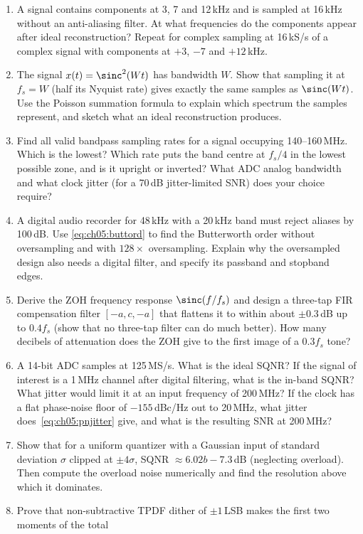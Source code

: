 \problems
\begin{enumerate}[label=\thechapter.\arabic*]
\item A signal contains components at 3, 7 and 12\,kHz and is sampled at 16\,kHz without an
anti-aliasing filter. At what frequencies do the components appear after ideal reconstruction?
Repeat for complex sampling at 16\,kS/s of a complex signal with components at $+3$, $-7$ and
$+12$\,kHz.
\item The signal $x(t)=\sinc^2(Wt)$ has bandwidth $W$. Show that sampling it at $f_s=W$ (half its
Nyquist rate) gives exactly the same samples as $\sinc(Wt)$. Use the Poisson summation formula to
explain which spectrum the samples represent, and sketch what an ideal reconstruction produces.
\item Find all valid bandpass sampling rates for a signal occupying 140--160\,MHz. Which is the
lowest? Which rate puts the band centre at $f_s/4$ in the lowest possible zone, and is it upright or
inverted? What ADC analog bandwidth and what clock jitter (for a 70\,dB jitter-limited SNR) does
your choice require?
\item A digital audio recorder for 48\,kHz with a 20\,kHz band must reject aliases by 100\,dB. Use
\eqref{eq:ch05:buttord} to find the Butterworth order without oversampling and with $128\times$
oversampling. Explain why the oversampled design also needs a digital filter, and specify its
passband and stopband edges.
\item Derive the ZOH frequency response $\sinc(f/f_s)$ and design a three-tap FIR compensation
filter $[-a,c,-a]$ that flattens it to within about $\pm0.3$\,dB up to $0.4f_s$ (show that no
three-tap filter can do much better). How many decibels of
attenuation does the ZOH give to the first image of a $0.3f_s$ tone?
\item A 14-bit ADC samples at 125\,MS/s. What is the ideal SQNR? If the signal of interest is a
1\,MHz channel after digital filtering, what is the in-band SQNR? What jitter would limit it at
an input frequency of 200\,MHz? If the clock has a flat phase-noise floor of $-155$\,dBc/Hz out to
20\,MHz, what jitter does~\eqref{eq:ch05:pnjitter} give, and what is the resulting SNR at 200\,MHz?
\item Show that for a uniform quantizer with a Gaussian input of standard deviation $\sigma$
clipped at $\pm4\sigma$, SQNR $\approx 6.02b-7.3$\,dB (neglecting overload). Then compute the
overload noise numerically and find the resolution above which it dominates.
\item Prove that non-subtractive TPDF dither of $\pm1$\,LSB makes the first two moments of the total

\end{enumerate}
